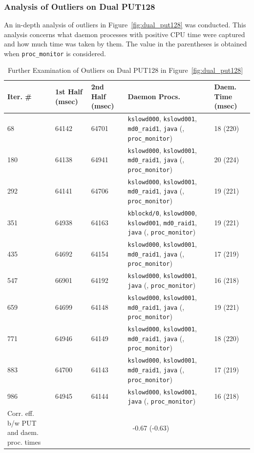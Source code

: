 \documentclass[10pt]{article}
\begin{document}
\clearpage
\newpage

\subsubsection{Analysis of Outliers on Dual PUT128}

An in-depth analysis of outliers in Figure~\ref{fig:dual_put128} was conducted. 
This analysis concerns what daemon processes with positive CPU time were captured and how much time was taken by them.
The value in the parentheses is obtained when {\tt proc\_monitor} is considered.

\begin{table}[htp!]
\centering
{
 \begin{tabular}{|p{2cm}|l|l|p{5.5cm}|p{2cm}|} \hline
Iter. \# & 1st Half (msec) & 2nd Half (msec) & Daemon Procs. & Daem. Time (msec)\\ \hline
68   & 64142 &  64701 & {\tt kslowd000}, {\tt kslowd001}, {\tt md0\_raid1}, {\tt java} (, {\tt proc\_monitor}) & 18 (220)\\ \hline
180  & 64138 & 64941 & {\tt kslowd000}, {\tt kslowd001}, {\tt md0\_raid1}, {\tt java} (, {\tt proc\_monitor}) & 20 (224)\\ \hline
292  & 64141 & 64706 & {\tt kslowd000}, {\tt kslowd001}, {\tt md0\_raid1}, {\tt java} (, {\tt proc\_monitor}) & 19 (221)\\ \hline
351  & 64938 & 64163 & {\tt kblockd/0}, {\tt kslowd000}, {\tt kslowd001}, {\tt md0\_raid1}, {\tt java} (, {\tt proc\_monitor}) & 19 (221)\\ \hline
435  & 64692 & 64154 & {\tt kslowd000}, {\tt kslowd001}, {\tt md0\_raid1}, {\tt java}  (, {\tt proc\_monitor}) & 17 (219)\\ \hline
547  & 66901 & 64192 & {\tt kslowd000}, {\tt kslowd001}, {\tt java} (, {\tt proc\_monitor}) & 16 (218)\\ \hline
659  & 64699 & 64148 & {\tt kslowd000}, {\tt kslowd001}, {\tt md0\_raid1}, {\tt java} (, {\tt proc\_monitor}) & 19 (221)\\ \hline
771  & 64946 & 64149 & {\tt kslowd000}, {\tt kslowd001}, {\tt md0\_raid1}, {\tt java} (, {\tt proc\_monitor}) & 18 (220)\\ \hline
883  & 64700 & 64143 & {\tt kslowd000}, {\tt kslowd001}, {\tt md0\_raid1}, {\tt java} (, {\tt proc\_monitor}) & 17 (219)\\ \hline
986  & 64945 & 64144 & {\tt kslowd000}, {\tt kslowd001}, {\tt java} (, {\tt proc\_monitor}) & 16 (218)\\ \hline \hline %
Corr. eff. b/w PUT and daem. proc. times& \multicolumn{4}{|c||}{-0.67 (-0.63)} \\ \hline
  \end{tabular}
  }
 \caption{Further Examination of Outliers on Dual PUT128 in Figure~\ref{fig:dual_put128}~\label{fig:dual_put128_stat}}
\end{table}
\end{document}
